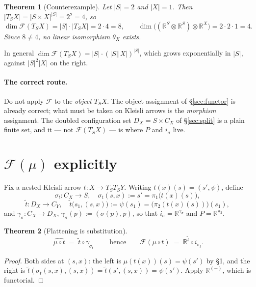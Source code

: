 \documentclass[12pt]{article}
\theoremstyle{plain}
\newtheorem{theorem}{Theorem}
\theoremstyle{remark}
\newcommand{\RR}{\mathbb R}
\begin{document}
\begin{theorem}[Counterexample]
Let $|S|=2$ and $|X|=1$. Then $|T_SX|=|S\times X|^{|S|}=2^{2}=4$, so
\[
\dim\mathcal F(T_SX)=|S|\cdot|T_SX|=2\cdot 4=8,
\qquad
\dim\bigl((\RR^{S}\otimes\RR^{S})\otimes\RR^{X}\bigr)=2\cdot 2\cdot 1=4 .
\]
Since $8\neq4$, no linear isomorphism $\theta_X$ exists.
\end{theorem}

In general $\dim\mathcal F(T_SX)=|S|\cdot(|S||X|)^{|S|}$, which grows
exponentially in $|S|$, against $|S|^2|X|$ on the right.

\paragraph{The correct route.}
Do not apply $\mathcal F$ to the \emph{object} $T_SX$. The object assignment of
\S\ref{sec:functor} is already correct; what must be taken on Kleisli arrows is
the \emph{morphism} assignment. The doubled configuration set $D_X=S\times C_X$
of \S\ref{sec:split} is a plain finite set, and it --- not $\mathcal F(T_SX)$
--- is where $P$ and $i_\sigma$ live.

\bigskip
\section{\texorpdfstring{$\mathcal F(\mu)$}{F(mu)} explicitly}

Fix a nested Kleisli arrow $t:X\to T_ST_SY$. Writing
$t(x)(s)=(s',\psi)$, define
\[
\sigma_t:C_X\to S,\quad \sigma_t(s,x):=s'=\pi_1\bigl(t(x)(s)\bigr),
\]
\[
\widetilde t:D_X\to C_Y,\quad
\widetilde t\bigl(s_1,(s,x)\bigr):=\psi(s_1)=\bigl(\pi_2 (t(x)(s))\bigr)(s_1),
\]
and $\gamma_\sigma:C_X\to D_X$, $\gamma_\sigma(p):=(\sigma(p),p)$, so that
$i_\sigma=\RR^{\gamma_\sigma}$ and $P=\RR^{\pi_2}$.

\begin{theorem}[Flattening is substitution]
\label{thm:subst}
\[
\boxed{\;\widehat{\mu\circ t}\;=\;\widetilde t\circ\gamma_{\sigma_t}\;}
\qquad\text{hence}\qquad
\mathcal F(\mu\circ t)\;=\;\RR^{\widetilde t}\circ i_{\sigma_t}.
\]
\end{theorem}

\begin{proof}
Both sides at $(s,x)$: the left is $\mu(t(x))(s)=\psi(s')$ by \S1, and the
right is $\widetilde t(\sigma_t(s,x),(s,x))=\widetilde t(s',(s,x))=\psi(s')$.
Apply $\RR^{(-)}$, which is functorial.
\end{proof}
\end{document}
